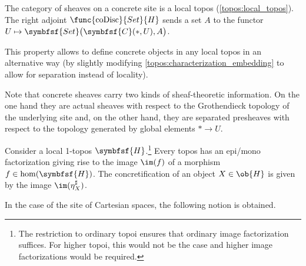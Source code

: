     \begin{property}
        The category of sheaves on a concrete site is a local topos (\cref{topos:local_topos}). The right adjoint $\func{\mathrm{coDisc}}{Set}{H}$ sends a set $A$ to the functor $U\mapsto\symbfsf{Set}\bigl(\symbfsf{C}(\ast,U),A\bigr)$.
    \end{property}
    This property allows to define concrete objects in any local topos in an alternative way (by slightly modifying \cref{topos:characterization_embedding} to allow for separation instead of locality).
    \begin{remark}
        Note that concrete sheaves carry two kinds of sheaf-theoretic information. On the one hand they are actual sheaves with respect to the Grothendieck topology of the underlying site and, on the other hand, they are separated presheaves with respect to the topology generated by global elements $\ast\rightarrow U$.
    \end{remark}

    \begin{property}[Concretification]\label{topos:concretification}
        Consider a local 1-topos $\symbfsf{H}$.\footnote{The restriction to ordinary topoi ensures that ordinary image factorization suffices. For higher topoi, this would not be the case and higher image factorizations would be required.} Every topos has an epi/mono factorization giving rise to the image $\im(f)$ of a morphism $f\in\hom(\symbfsf{H})$. The concretification of an object $X\in\ob{H}$ is given by the image $\im(\eta^\sharp_X)$. 
    \end{property}

    In the case of the site of Cartesian spaces, the following notion is obtained.

